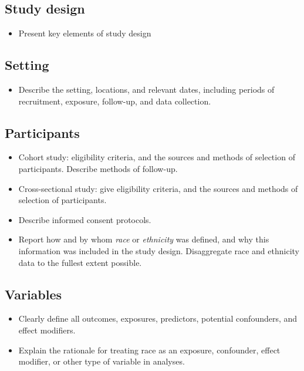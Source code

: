 \documentclass[
  letterpaper,
  DIV=11,
  numbers=noendperiod]{scrartcl}
\providecommand{\tightlist}{%
  \setlength{\itemsep}{0pt}\setlength{\parskip}{0pt}}\usepackage{longtable,booktabs,array}
\begin{document}
\hypertarget{sec-design}{%
\subsection{Study design}\label{sec-design}}

\begin{itemize}
\tightlist
\item
  Present key elements of study design
\end{itemize}

\hypertarget{sec-setting}{%
\subsection{Setting}\label{sec-setting}}

\begin{itemize}
\tightlist
\item
  Describe the setting, locations, and relevant dates, including periods
  of recruitment, exposure, follow-up, and data collection.
\end{itemize}

\hypertarget{sec-participants}{%
\subsection{Participants}\label{sec-participants}}

\begin{itemize}
\tightlist
\item
  Cohort study: eligibility criteria, and the sources and methods of
  selection of participants. Describe methods of follow-up.
\item
  Cross-sectional study: give eligibility criteria, and the sources and
  methods of selection of participants.
\item
  Describe informed consent protocols.
\item
  Report how and by whom \emph{race} or \emph{ethnicity} was defined,
  and why this information was included in the study design.
  Disaggregate race and ethnicity data to the fullest extent possible.
\end{itemize}

\hypertarget{sec-vars}{%
\subsection{Variables}\label{sec-vars}}

\begin{itemize}
\tightlist
\item
  Clearly define all outcomes, exposures, predictors, potential
  confounders, and effect modifiers.
\item
  Explain the rationale for treating race as an exposure, confounder,
  effect modifier, or other type of variable in analyses.
\end{itemize}
\end{document}
